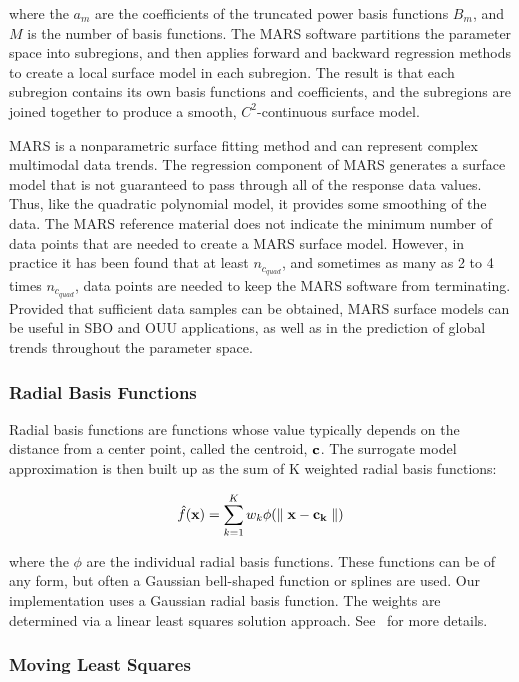where the $a_{m}$ are the coefficients of the truncated power basis
functions $B_{m}$, and $M$ is the number of basis functions. The MARS
software partitions the parameter space into subregions, and then
applies forward and backward regression methods to create a local
surface model in each subregion. The result is that each subregion
contains its own basis functions and coefficients, and the subregions
are joined together to produce a smooth, $C^{2}$-continuous surface
model.

MARS is a nonparametric surface fitting method and can represent
complex multimodal data trends. The regression component of MARS
generates a surface model that is not guaranteed to pass through all
of the response data values. Thus, like the quadratic polynomial
model, it provides some smoothing of the data. The MARS reference
material does not indicate the minimum number of data points that are
needed to create a MARS surface model. However, in practice it has
been found that at least $n_{c_{quad}}$, and sometimes as many as 2 to
4 times $n_{c_{quad}}$, data points are needed to keep the MARS
software from terminating.  Provided that sufficient data samples can
be obtained, MARS surface models can be useful in SBO and OUU
applications, as well as in the prediction of global trends throughout
the parameter space.

\subsubsection{Radial Basis Functions}\label{models:surf:rbf}

Radial basis functions are functions whose value typically depends on the 
distance from a center point, called the centroid, ${\bf c}$. 
The surrogate model approximation is then built up as the sum of K 
weighted radial basis functions: 

\begin{equation}
  \hat{f}({\bf x})=\sum_{k=1}^{K}w_{k}\phi({\parallel {\bf x} - {\bf c_{k}} \parallel})
  \label{models:surf:equation11}  
\end{equation}

where the $\phi$ are the individual radial basis functions.  
These functions can be of any form, but often a Gaussian bell-shaped 
function or splines are used.  
Our implementation uses a Gaussian radial basis function. 
The weights are determined via a linear least squares solution approach.
See~\cite{Orr96} for more details.

\subsubsection{Moving Least Squares}\label{models:surf:mls}

